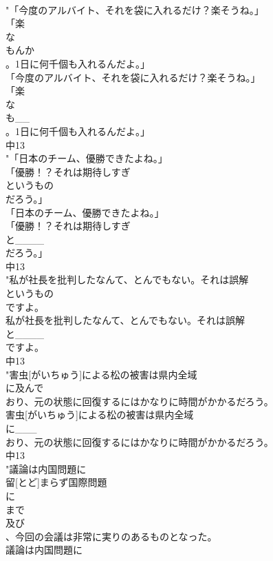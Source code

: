 \documentclass[8pt]{extreport}
\begin{document}
\begin{CJK}{UTF8}{min}
\\	"「今度のアルバイト、それを袋に入れるだけ？楽そうね。」
\\	「楽
\\	な
\\	もんか
\\	。1日に何千個も入れるんだよ。」
\\	「今度のアルバイト、それを袋に入れるだけ？楽そうね。」
\\	「楽
\\	な
\\	も__
\\	。1日に何千個も入れるんだよ。」
\\	中13
\\	"「日本のチーム、優勝できたよね。」
\\	「優勝！？それは期待しすぎ
\\	というもの
\\	だろう。」
\\	「日本のチーム、優勝できたよね。」
\\	「優勝！？それは期待しすぎ
\\	と____
\\	だろう。」
\\	中13
\\	"私が社長を批判したなんて、とんでもない。それは誤解
\\	というもの
\\	ですよ。
\\	私が社長を批判したなんて、とんでもない。それは誤解
\\	と____
\\	ですよ。
\\	中13
\\	"害虫[がいちゅう]による松の被害は県内全域
\\	に及んで
\\	おり、元の状態に回復するにはかなりに時間がかかるだろう。
\\	害虫[がいちゅう]による松の被害は県内全域
\\	に___
\\	おり、元の状態に回復するにはかなりに時間がかかるだろう。
\\	中13
\\	"議論は内国問題に
\\	留[とど]まらず国際問題
\\	に
\\	まで
\\	及び
\\	、今回の会議は非常に実りのあるものとなった。
\\	議論は内国問題に

\end{CJK}
\end{document}
